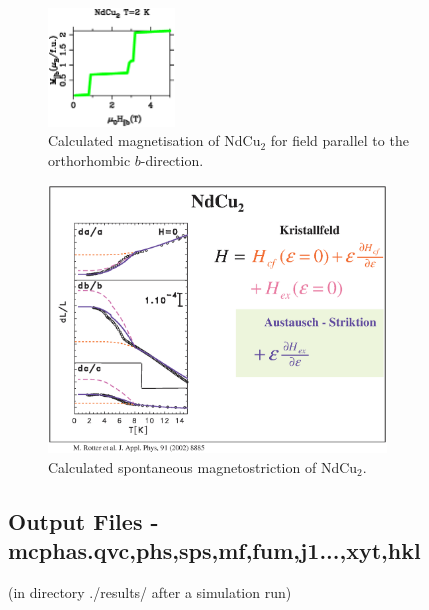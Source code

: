 \begin{figure}[t]%
\begin{center}\leavevmode
\includegraphics[angle=0, width=0.3\textwidth]{figsrc/magnetization_ndcu2.ps}
\end{center}
\caption{Calculated magnetisation of NdCu$_2$ for field parallel to the orthorhombic $b$-direction.}
\label{magnetization}
\end{figure}

\begin{figure}[t]%
\begin{center}\leavevmode
\includegraphics[angle=0, width=0.8\textwidth]{figsrc/magnetostriction_ndcu2.eps}
\end{center}
\caption{Calculated spontaneous magnetostriction of NdCu$_2$.}
\label{magnetostrictiongraphic}
\end{figure}

\subsection{Output Files - {\prg mcphas.qvc,phs,sps,mf,fum,j1...,xyt,hkl} }\label{outputfiles}
 (in directory ./results/ after a simulation run) 


